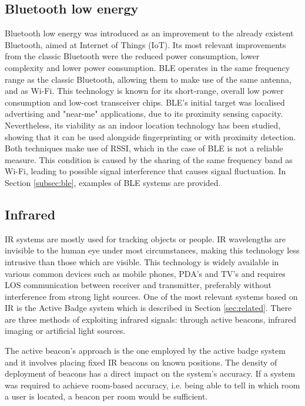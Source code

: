   
  
  
\subsection{Bluetooth low energy}  
\label{subsec:ble-tech}  
  
  
Bluetooth low energy was introduced as an improvement to the already existent Bluetooth, aimed at Internet of Things (IoT). Its most relevant improvements from the classic Bluetooth were the reduced power consumption, lower complexity and lower power consumption. \ac{BLE} operates in the same frequency range as the classic Bluetooth, allowing them to make use of the same antenna, and as Wi-Fi. This technology is known for its short-range, overall low power consumption and low-cost transceiver chips.  
\ac{BLE}'s initial target was localised advertising and "near-me" applications, due to its proximity sensing capacity. Nevertheless, its viability as an indoor location technology has been studied, showing that it can be used alongside fingerprinting or with proximity detection. Both techniques make use of \ac{RSSI}, which in the case of \ac{BLE} is not a reliable measure. This condition is caused by the sharing of the same frequency band as Wi-Fi, leading to possible signal interference that causes signal fluctuation. In Section \ref{subsec:ble}, examples of \ac{BLE} systems are provided.  
  
  
\subsection{Infrared}  
\label{subsec:ir}  
  
  
\ac{IR} systems are mostly used for tracking objects or people. \ac{IR} wavelengths are invisible to the human eye under most circumstances, making this technology less intrusive than those which are visible. This technology is widely available in various common devices such as mobile phones, PDA's and TV's and requires \ac{LOS} communication between receiver and transmitter, preferably without interference from strong light sources. One of the most relevant systems based on \ac{IR} is the Active Badge system which is described in Section \ref{sec:related}. There are three methods of exploiting infrared signals: through active beacons, infrared imaging or artificial light sources.  
  
The active beacon's approach is the one employed by the active badge system and it involves placing fixed \ac{IR} beacons on known positions. The density of deployment of beacons has a direct impact on the system's accuracy. If a system was required to achieve room-based accuracy, i.e. being able to tell in which room a user is located, a beacon per room would be sufficient.   
  
